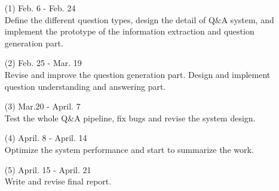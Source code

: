 \documentclass[a4page]{article}
\begin{document}
\begin{itemize}
\item[(1)]Feb. 6 - Feb. 24 \\ Define the different question types, design the detail of Q\&A system, and implement the prototype of the information extraction and question generation part.
\item[(2)]Feb. 25 - Mar. 19 \\ Revise and improve the question generation part. Design and implement question understanding and answering part.
\item[(3)]Mar.20 - April. 7 \\ Test the whole Q\&A pipeline, fix bugs and revise the system design.
\item[(4)]April. 8 - April. 14 \\ Optimize the system performance and start to summarize the work.
\item[(5)]April. 15 - April. 21 \\ Write and revise final report.

\end{itemize}
\end{document}
